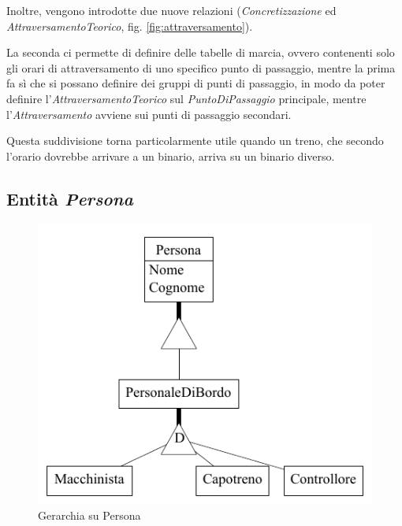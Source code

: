 \documentclass[a4paper,12pt]{report}
\begin{document}
	\par Inoltre, vengono introdotte due nuove relazioni (\textit{Concretizzazione} ed \textit{AttraversamentoTeorico}, fig. \ref{fig:attraversamento}).
	\par La seconda ci permette di definire delle tabelle di marcia, ovvero contenenti solo gli orari di attraversamento di uno specifico punto di passaggio, mentre la prima fa sì che si possano definire dei gruppi di punti di passaggio, in modo da poter definire l'\textit{AttraversamentoTeorico} sul \textit{PuntoDiPassaggio} principale, mentre l'\textit{Attraversamento} avviene sui punti di passaggio secondari.
	\par Questa suddivisione torna particolarmente utile quando un treno, che secondo l'orario dovrebbe arrivare a un binario, arriva su un binario diverso.
	\subsection{Entità \textit{Persona}}
	\begin{figure}[h!]
		\begin{center}
			\includegraphics{res/schema/persona}
		\end{center}
		\caption{Gerarchia su Persona}
		\label{fig:persona}
	\end{figure}
\end{document}
